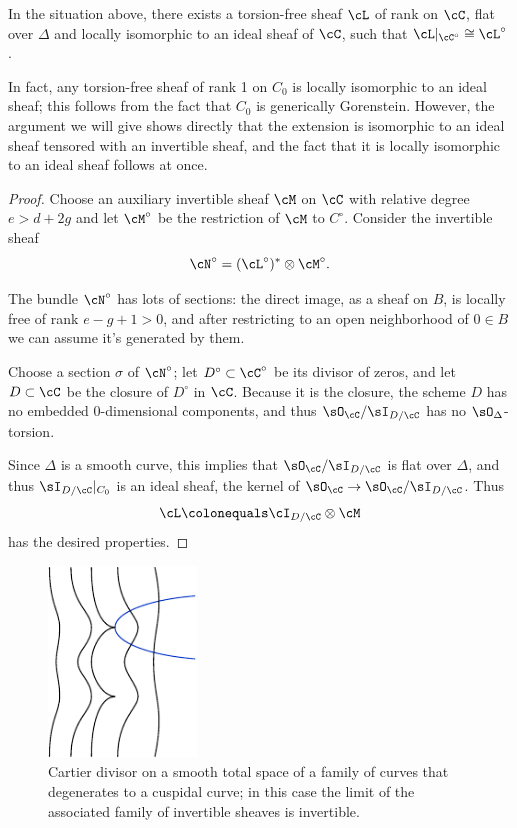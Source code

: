 \begin{lemma}\label{limit sheaf}
In the situation above, there exists a torsion-free sheaf $\cL$ of rank
%
\1 on $\cC$, flat over $\Delta$ and locally isomorphic to
an ideal sheaf of $\cC$, such that $\cL|_{\cC^\circ} \cong\nobreak \cL^\circ$.
\unif
\end{lemma}

In fact, any torsion-free sheaf of rank 1 on $C_{0}$ is locally isomorphic
to an ideal sheaf; this follows from the fact that $C_{0}$ is generically
Gorenstein.
%
However, the argument we will give
shows directly that the extension is isomorphic to an ideal sheaf tensored
with an invertible sheaf, and the fact that
it is locally isomorphic to an ideal sheaf follows at once.

\begin{proof} Choose an auxiliary invertible sheaf $\cM$ on $\cC$ with
relative degree $e > d + 2g$ and let $\cM^\circ$ be the restriction of
$\cM$ to $C^\circ$. Consider the invertible sheaf
$$
\cN^\circ = (\cL^\circ)^* \otimes \cM^\circ.
$$

The bundle $\cN^\circ$ has lots of sections: the direct image, as a sheaf
on $B$, is locally free of rank $e-g+1 > 0$, and after restricting to
an open neighborhood of $0 \in B$ we can assume it's generated by them.

Choose a section $\sigma$ of $\cN^\circ$; let $D^\circ \subset \cC^\circ$
be its divisor of zeros, and let $D \subset \cC$ be the closure of
$D^\circ$ in $\cC$. Because it is the closure, the scheme $D$ has
no embedded
0-dimensional components, and thus $\sO_{\cC}/\sI_{D/\cC}$ has no
$\sO_{\Delta}$-torsion.

Since $\Delta$ is a smooth
curve, this implies that $\sO_{\cC}/\sI_{D/\cC}$ is flat over $\Delta$,
and thus $\sI_{D/\cC}|_{C_{0}}$
is an ideal sheaf, the kernel of $\sO_{\cC} \to
\sO_{\cC}/\sI_{D/\cC}$. Thus
$$
\cL \colonequals  \cI_{D/\cC} \otimes \cM
$$
has the desired properties.
\unif
\end{proof}

\begin{figure}
\centerline {\includegraphics[height=2in]{main/Fig13-1}}
\caption{Cartier divisor on a smooth total space of a family of curves
that degenerates to a cuspidal curve; in this case the
limit of the associated family of invertible sheaves is invertible.}
\label{Fig13.1}
\end{figure}

